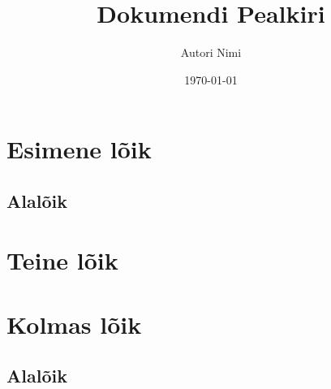 \documentclass[10pt,a4paper, twoside]{article}
\title{Dokumendi Pealkiri}
\author{Autori Nimi}
\date{\today}
\begin{document}
\clearpage\maketitle
\thispagestyle{empty}
\pagebreak
\section{Esimene lõik}
\subsection{Alalõik}
\lipsum[1-6]

\section{Teine lõik}
\lipsum[1]

\section{Kolmas lõik}
\subsection{Alalõik}
\lipsum[1]
\end{document}
